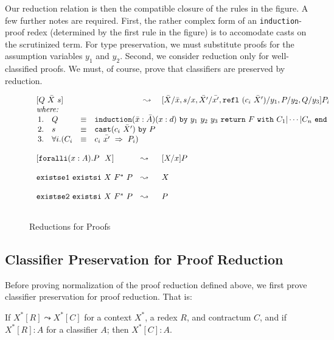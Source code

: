 \documentclass{fundam}
\begin{document}
Our reduction relation is then the compatible closure of the rules in
the figure.  A few further notes are required.  First, the rather
complex form of an \texttt{induction}-proof redex (determined by the
first rule in the figure) is to accomodate casts on the scrutinized
term.  For type preservation, we must substitute proofs for the
assumption variables $y_1$ and $y_2$.  Second, we consider reduction
only for well-classified proofs.  We must, of course, prove that
classifiers are preserved by reduction.

\begin{figure}
\[
\begin{array}{lll}
\ [Q \ 
 \bar{X}\ s] & \ \leadsto\ & [\bar{X}/\bar{x},s/x,\bar{X'}/\bar{x'},\texttt{refl}\ (c_i\ \bar{X}')/y_1,P/y_2,Q/y_3] P_i \\
\ \textit{where:} &\ &\ \\
\multicolumn{3}{l}
{\begin{array}{llll}
1. &  Q & \equiv & \texttt{induction}(\bar{x}:\bar{A})(x:d)\ \texttt{by}\ y_1\ y_2\ y_3\ \texttt{return}\ F 
\ \texttt{with}\ C_1 | \cdots | C_n\ \texttt{end} \\
2. & s & \equiv & \texttt{cast} (c_i\ \bar{X}')\ \texttt{by}\ P \\
3. & \forall i. (C_i & \equiv & c_i\ \bar{x'} \ \Rightarrow \ P_i)
\end{array}}
\\ \\
 \ [\texttt{foralli}(x:A).P\ \ X] & \leadsto & [X/x]P
\\ \\
\ \texttt{existse1}\ \texttt{existsi}\  X\ F^*\ P & \leadsto & X \\ \\
\ \texttt{existse2}\ \texttt{existsi}\ X\ F^*\ P & \leadsto & P
\\ \\
\end{array}
\]
\caption{\label{fig:pf-red}Reductions for Proofs}
\end{figure}

\subsection{Classifier Preservation for Proof Reduction}

Before proving normalization of the proof reduction defined above, we
first prove classifier preservation for proof reduction.  That is:

\begin{theorem}
\label{thm:tp-pres-pf} If
$X^*[R]\leadsto X^*[C]$ for a context $X^*$, a redex $R$, and
contractum $C$, and if $X^*[R] : A$ for a classifier $A$; then $X^*[C]
: A$.
\end{theorem}
\end{document}

